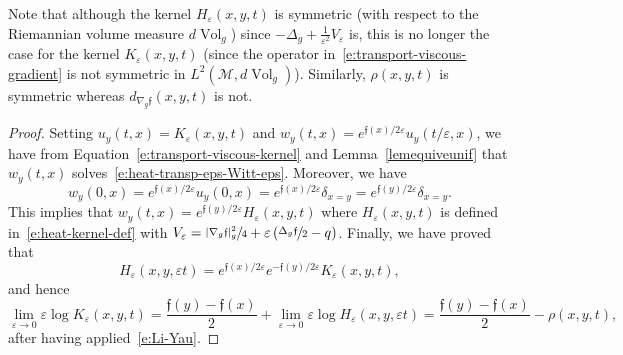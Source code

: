 \documentclass[JEP,XML,SOM,Unicode]{cedram}
\theoremstyle{definition}
\newcommand{\M}{\ensuremath{\mathcal M}}
\newcommand{\f}{\ensuremath{\mathfrak{f}}}
\DeclareMathOperator{\Vol}{Vol}
\newcommand\bnp{\begin{proof}}
\newcommand\enp{\end{proof}}
\newcommand\Lap{\Delta_{g}}
\newcommand\nablag{\nabla_{g}}
\let\e\varepsilon
\let\eps\varepsilon
\let\q q
\begin{document}
Note that although the kernel $H_\e(x,y,t)$ is symmetric (with respect to the Riemannian volume measure $d\Vol_g$) since $-\Delta_g+\frac{1}{\e^2} V_\eps$ is, this is no longer the case for the kernel $K_\e(x,y,t)$ (since the operator in~\eqref{e:transport-viscous-gradient} is not symmetric in $L^2(\M,d\Vol_g)$). Similarly, $\rho(x,y,t)$ is symmetric whereas $d_{\nablag \f}(x,y,t)$ is not.

\bnp
Setting $u_y(t,x) = K_{\e}(x,y, t)$ and $w_y(t,x) = e^{\f(x)/2\eps} u_y(t/\eps,x)$, we have from Equation~\eqref{e:transport-viscous-kernel} and Lemma~\ref{lemequiveunif} that $w_y(t,x)$ solves~\eqref{e:heat-transp-eps-Witt-eps}. Moreover, we have
\[
w_y(0,x)= e^{\f(x)/2\eps} u_y(0,x)= e^{\f(x)/2\eps} \delta_{x=y} = e^{\f(y)/2\eps}\delta_{x=y}.
\]
This implies that $w_y (t,x) = e^{\f(y)/2\eps} H_\eps (x,y,t)$ where $H_\eps (x,y,t)$ is defined in~\eqref{e:heat-kernel-def} with $V_\eps = \sfrac{|\nablag \f|_g^2}{4} + \eps \left( \sfrac{\Lap \f}{2}- \q \right)$.
Finally, we have proved that
\[
H_\eps (x,y,\eps t) =e^{\f(x)/2\eps} e^{-\f(y)/2\eps} K_\eps (x,y,t),
\]
and hence
\[
\underset{\e\to 0}{\lim}\e \log K_{\e}(x,y, t)= \frac{\f(y)-\f(x)}{2} +\underset{\e\to 0}{\lim}\e \log H_{\e}(x,y,\eps t)
= \frac{\f(y)-\f(x)}{2} -\rho(x,y,t),
\]
after having applied~\eqref{e:Li-Yau}.
\enp
\end{document}
